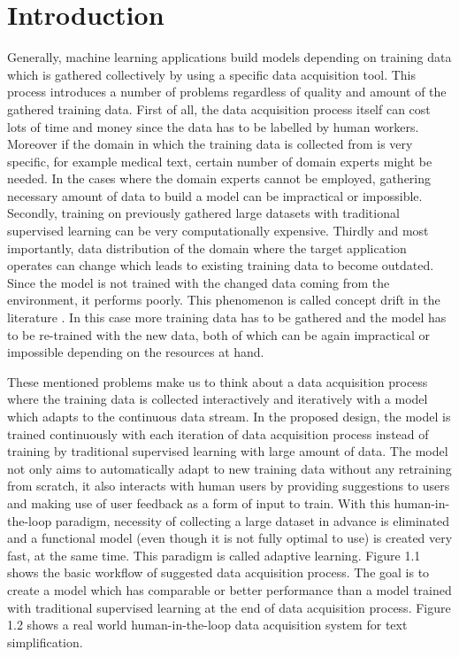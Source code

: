 \chapter{Introduction}\label{introduction}

Generally, machine learning applications build models depending on training data which is gathered collectively by using a specific data acquisition tool. This process introduces a number of problems regardless of quality and amount of the gathered training data. First of all, the data acquisition process itself can cost lots of time and money since the data has to be labelled by human workers. Moreover if the domain in which the training data is collected from is very specific, for example medical text, certain number of domain experts might be needed. In the cases where the domain experts cannot be employed, gathering necessary amount of data to build a model can be impractical or impossible. Secondly, training on previously gathered large datasets with traditional supervised learning can be very computationally expensive. Thirdly and most importantly, data distribution of the domain where the target application operates can change which leads to existing training data to become outdated. Since the model is not trained with the changed data coming from the environment, it performs poorly. This phenomenon is called concept drift in the literature \cite{concept}. In this case more training data has to be gathered and the model has to be re-trained with the new data, both of which can be again impractical or impossible depending on the resources at hand.

These mentioned problems make us to think about a data acquisition process where the training data is collected interactively and iteratively with a model which adapts to the continuous data stream. In the proposed design, the model is trained continuously with each iteration of data acquisition process instead of training by traditional supervised learning with large amount of data. The model not only aims to automatically adapt to new training data without any retraining from scratch, it also interacts with human users by providing suggestions to users and making use of user feedback as a form of input to train. With this human-in-the-loop paradigm, necessity of collecting a large dataset in advance is eliminated and a functional model (even though it is not fully optimal to use) is created very fast, at the same time. This paradigm is called adaptive learning. Figure 1.1 shows the basic workflow of suggested data acquisition process. The goal is to create a model which has comparable or better performance than a model trained with traditional supervised learning at the end of data acquisition process. Figure 1.2 shows a real world human-in-the-loop data acquisition system for text simplification.

